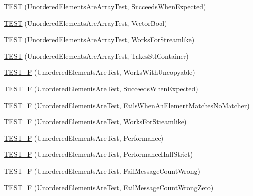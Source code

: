 \begin{DoxyCompactItemize}
\mbox{\hyperlink{namespacetesting_1_1gmock__matchers__test_adb7e47654f1536fc049243f765292825}{T\+E\+ST}} (Unordered\+Elements\+Are\+Array\+Test, Succeeds\+When\+Expected)
\item 
\mbox{\hyperlink{namespacetesting_1_1gmock__matchers__test_a3d7df4fa0dd3e8247f4c2d4b02d801f0}{T\+E\+ST}} (Unordered\+Elements\+Are\+Array\+Test, Vector\+Bool)
\item 
\mbox{\hyperlink{namespacetesting_1_1gmock__matchers__test_a1ff2a93a8f031a5b23dbc699a462043b}{T\+E\+ST}} (Unordered\+Elements\+Are\+Array\+Test, Works\+For\+Streamlike)
\item 
\mbox{\hyperlink{namespacetesting_1_1gmock__matchers__test_aa3a960ec78e2b1e860c305f4598f39ec}{T\+E\+ST}} (Unordered\+Elements\+Are\+Array\+Test, Takes\+Stl\+Container)
\item 
\mbox{\hyperlink{namespacetesting_1_1gmock__matchers__test_ab09132c3b991b8f104f3091370d2fe55}{T\+E\+S\+T\+\_\+F}} (Unordered\+Elements\+Are\+Test, Works\+With\+Uncopyable)
\item 
\mbox{\hyperlink{namespacetesting_1_1gmock__matchers__test_a177c3db59da001df2441deb1ddb083af}{T\+E\+S\+T\+\_\+F}} (Unordered\+Elements\+Are\+Test, Succeeds\+When\+Expected)
\item 
\mbox{\hyperlink{namespacetesting_1_1gmock__matchers__test_a62fd481b1160a667c785e6009ff87163}{T\+E\+S\+T\+\_\+F}} (Unordered\+Elements\+Are\+Test, Fails\+When\+An\+Element\+Matches\+No\+Matcher)
\item 
\mbox{\hyperlink{namespacetesting_1_1gmock__matchers__test_a2affca2a152e4537c2f06518eaa2eac5}{T\+E\+S\+T\+\_\+F}} (Unordered\+Elements\+Are\+Test, Works\+For\+Streamlike)
\item 
\mbox{\hyperlink{namespacetesting_1_1gmock__matchers__test_a074ca2babea203d1a54d69ff1fde5c59}{T\+E\+S\+T\+\_\+F}} (Unordered\+Elements\+Are\+Test, Performance)
\item 
\mbox{\hyperlink{namespacetesting_1_1gmock__matchers__test_a4437de9d40efd87f73b738ef38c2d70f}{T\+E\+S\+T\+\_\+F}} (Unordered\+Elements\+Are\+Test, Performance\+Half\+Strict)
\item 
\mbox{\hyperlink{namespacetesting_1_1gmock__matchers__test_a5dd3b28b540c1ef01e623f840c48e7b4}{T\+E\+S\+T\+\_\+F}} (Unordered\+Elements\+Are\+Test, Fail\+Message\+Count\+Wrong)
\item 
\mbox{\hyperlink{namespacetesting_1_1gmock__matchers__test_a7dc8c467fe0d6f26c0ee643be56eb590}{T\+E\+S\+T\+\_\+F}} (Unordered\+Elements\+Are\+Test, Fail\+Message\+Count\+Wrong\+Zero)
\item 

\end{DoxyCompactItemize}
